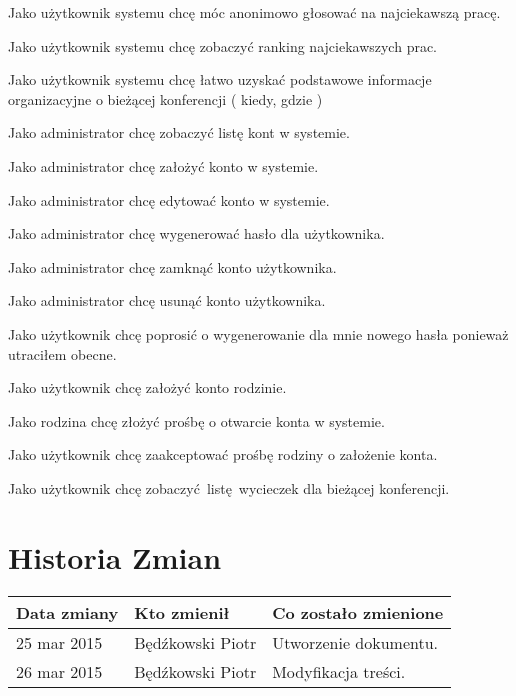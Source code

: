 Jako użytkownik systemu chcę móc anonimowo głosować na najciekawszą pracę. 

Jako użytkownik systemu chcę zobaczyć ranking najciekawszych prac. 

Jako użytkownik systemu chcę łatwo uzyskać podstawowe informacje organizacyjne o bieżącej konferencji ( kiedy, gdzie ) 

Jako administrator chcę zobaczyć listę kont w systemie. 

Jako administrator chcę założyć konto w systemie. 

Jako administrator chcę edytować konto w systemie. 

Jako administrator chcę wygenerować  hasło dla użytkownika.  

Jako administrator chcę zamknąć konto użytkownika.  

Jako administrator chcę usunąć konto użytkownika. 

Jako użytkownik chcę poprosić o wygenerowanie dla mnie nowego hasła ponieważ utraciłem obecne.

Jako użytkownik chcę założyć konto rodzinie.

Jako rodzina chcę złożyć prośbę o otwarcie konta w systemie.

Jako użytkownik chcę zaakceptować prośbę rodziny o założenie konta.

Jako użytkownik chcę zobaczyć listę wycieczek dla bieżącej konferencji.


\section{Historia Zmian}

\begin{tabularx}{\textwidth}{X|l|X}
\hline
\textbf{Data zmiany} & \textbf{Kto zmienił} & \textbf{Co zostało zmienione} \\ \hline
25 mar 2015          & Będźkowski Piotr     & Utworzenie dokumentu.         \\ \hline
26 mar 2015          & Będźkowski Piotr     & Modyfikacja treści.           \\ \hline
\end{tabularx}
